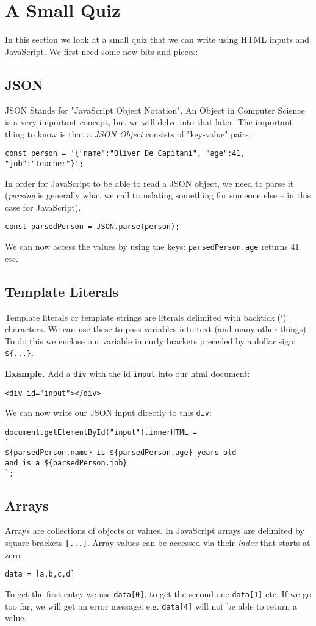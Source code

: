 \documentclass[11pt,a4paper]{report}
\begin{document}
\newpage
\section{A Small Quiz}
In this section we look at a small quiz that we can write using HTML inputs and JavaScript. We first need some new bits and pieces:
\subsection{JSON}
JSON Stands for "JavaScript Object Notation". An Object in Computer Science is a very important concept, but we will delve into that later. The important thing to know is that a \emph{JSON Object} consists of "key-value" pairs:
\begin{verbatim}
const person = '{"name":"Oliver De Capitani", "age":41, "job":"teacher"}';
\end{verbatim}
In order for JavaScript to be able to read a JSON object, we need to parse it (\emph{parsing} is generally what we call translating something for someone else -- in this case for JavaScript).
\begin{verbatim}
const parsedPerson = JSON.parse(person);
\end{verbatim}
We can now access the values by using the keys: \verb|parsedPerson.age| returns 41 etc.

\subsection{Template Literals}
Template literals or template strings are literals delimited with backtick (`) characters. We can use these to pass variables into text (and many other things). To do this we enclose our variable in curly brackets preceded by a dollar sign: \verb|${...}|.

{\bf Example.} Add a \verb|div| with the id \verb|input| into our html document:
\begin{verbatim}
<div id="input"></div>
\end{verbatim}
\newpage
We can now write our JSON input directly to this \verb|div|:
\begin{verbatim}
document.getElementById("input").innerHTML = 
`
${parsedPerson.name} is ${parsedPerson.age} years old 
and is a ${parsedPerson.job}
`;
\end{verbatim}

\subsection{Arrays}
Arrays are collections of objects or values. In JavaScript arrays are delimited by square brackets \verb|[...]|. Array values can be accessed via their \emph{index} that starts at zero:
\begin{verbatim}
data = [a,b,c,d]
\end{verbatim}
To get the first entry we use \verb|data[0]|, to get the second one \verb|data[1]| etc. If we go too far, we will get an error message: e.g. \verb|data[4]| will not be able to return a value.
\end{document}
